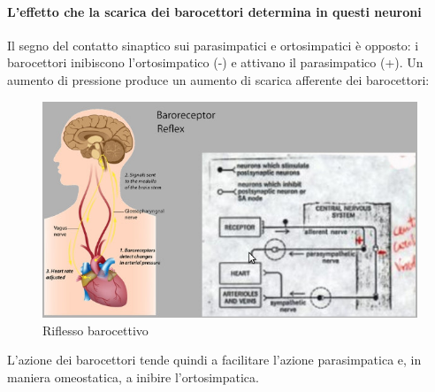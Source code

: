 \documentclass[a4paper,12pt]{article}
\begin{document}
\paragraph{L'effetto che la scarica dei barocettori determina in questi neuroni} Il segno del contatto sinaptico sui parasimpatici e ortosimpatici è opposto: i barocettori inibiscono l'ortosimpatico (-) e attivano il parasimpatico (+). Un aumento di pressione produce un aumento di scarica afferente dei barocettori:
\begin{figure}[H]
\centering
\includegraphics[scale=0.35]{immagine/barocettivo.jpg}
\caption{Riflesso barocettivo}
\end{figure}
L'azione dei barocettori tende quindi a facilitare l'azione parasimpatica e, in maniera omeostatica, a inibire l'ortosimpatica.
\end{document}
